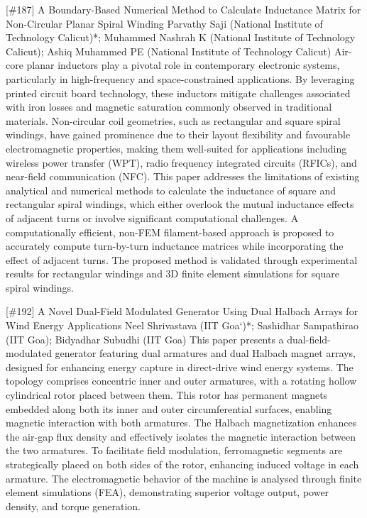 {} \begin{abstract_online} {[\#187] A Boundary-Based Numerical Method to Calculate Inductance Matrix for Non-Circular Planar Spiral Winding} {} {Parvathy Saji (National Institute of Technology Calicut)*; Muhammed  Nashrah K (National Institute of Technology Calicut); Ashiq Muhammed PE (National Institute of Technology Calicut)} {} Air-core planar inductors play a pivotal role in contemporary electronic systems, particularly in high-frequency and space-constrained applications. By leveraging printed circuit board technology, these inductors mitigate challenges associated with iron losses and magnetic saturation commonly observed in traditional materials. Non-circular coil geometries, such as rectangular and square spiral windings, have gained prominence due to their layout flexibility and favourable electromagnetic properties, making them well-suited for applications including wireless power transfer (WPT), radio frequency integrated circuits (RFICs), and near-field communication (NFC). This paper addresses the limitations of existing analytical and numerical methods to calculate the inductance of square and rectangular spiral windings, which either overlook the mutual inductance effects of adjacent turns or involve significant computational challenges. A computationally efficient, non-FEM filament-based approach is proposed to accurately compute turn-by-turn inductance matrices while incorporating the effect of adjacent turns. The proposed method is validated through experimental results for rectangular windings and 3D finite element simulations for square spiral windings. \end{abstract_online} 
{} \begin{abstract_online} {[\#192] A Novel Dual-Field Modulated Generator Using Dual Halbach Arrays for Wind Energy Applications} {} {Neel Shrivastava (IIT Goa`)*; Sashidhar Sampathirao (IIT Goa); Bidyadhar Subudhi (IIT Goa)} {} This paper presents a dual-field-modulated generator featuring dual armatures and dual Halbach magnet arrays, designed for enhancing energy capture in direct-drive wind energy systems. The topology comprises concentric inner and outer armatures, with a rotating hollow cylindrical rotor placed between them. This rotor has permanent magnets embedded along both its inner and outer circumferential surfaces, enabling magnetic interaction with both armatures. The Halbach magnetization enhances the air-gap flux density and effectively isolates the magnetic interaction between the two armatures. To facilitate field modulation, ferromagnetic segments are strategically placed on both sides of the rotor, enhancing induced voltage in each armature. The electromagnetic behavior of the machine is analysed through finite element simulations (FEA), demonstrating superior voltage output, power density, and torque generation. \end{abstract_online} 

